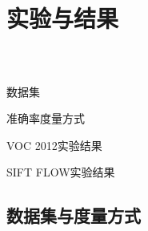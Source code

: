 \section{实验与结果}
\frame
{
	\frametitle{\secname~ }
	\begin{block}{数据集}
	\end{block}
	\begin{block}{准确率度量方式}
	\end{block}
	\begin{block}{VOC 2012实验结果}
	\end{block}
	\begin{block}{SIFT FLOW实验结果}
	\end{block}
}
\subsection*{数据集与度量方式}
